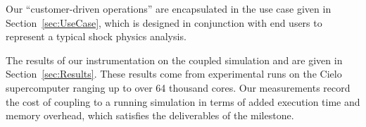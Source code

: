 Our ``customer-driven operations'' are encapsulated in the use case given
in Section~\ref{sec:UseCase}, which is designed in conjunction with end
users  to represent a
typical shock physics analysis.

The results of our instrumentation on the coupled simulation and \vda are
given in Section~\ref{sec:Results}.  These results come from experimental
runs on the Cielo supercomputer ranging up to over 64
thousand cores.  Our measurements record the cost of coupling \vda to a
running simulation in terms of added execution time and memory overhead,
which satisfies the deliverables of the milestone.
